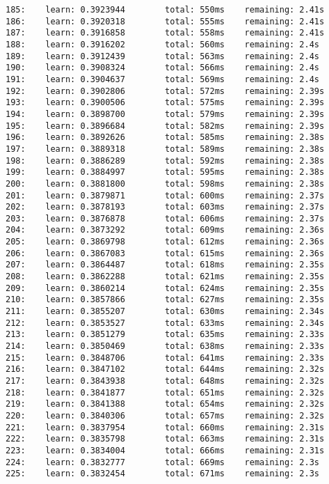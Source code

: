 \documentclass[11pt]{article}
\begin{document}
\begin{Verbatim}[commandchars=\\\{\}]
185:    learn: 0.3923944        total: 550ms    remaining: 2.41s
186:    learn: 0.3920318        total: 555ms    remaining: 2.41s
187:    learn: 0.3916858        total: 558ms    remaining: 2.41s
188:    learn: 0.3916202        total: 560ms    remaining: 2.4s
189:    learn: 0.3912439        total: 563ms    remaining: 2.4s
190:    learn: 0.3908324        total: 566ms    remaining: 2.4s
191:    learn: 0.3904637        total: 569ms    remaining: 2.4s
192:    learn: 0.3902806        total: 572ms    remaining: 2.39s
193:    learn: 0.3900506        total: 575ms    remaining: 2.39s
194:    learn: 0.3898700        total: 579ms    remaining: 2.39s
195:    learn: 0.3896684        total: 582ms    remaining: 2.39s
196:    learn: 0.3892626        total: 585ms    remaining: 2.38s
197:    learn: 0.3889318        total: 589ms    remaining: 2.38s
198:    learn: 0.3886289        total: 592ms    remaining: 2.38s
199:    learn: 0.3884997        total: 595ms    remaining: 2.38s
200:    learn: 0.3881800        total: 598ms    remaining: 2.38s
201:    learn: 0.3879871        total: 600ms    remaining: 2.37s
202:    learn: 0.3878193        total: 603ms    remaining: 2.37s
203:    learn: 0.3876878        total: 606ms    remaining: 2.37s
204:    learn: 0.3873292        total: 609ms    remaining: 2.36s
205:    learn: 0.3869798        total: 612ms    remaining: 2.36s
206:    learn: 0.3867083        total: 615ms    remaining: 2.36s
207:    learn: 0.3864487        total: 618ms    remaining: 2.35s
208:    learn: 0.3862288        total: 621ms    remaining: 2.35s
209:    learn: 0.3860214        total: 624ms    remaining: 2.35s
210:    learn: 0.3857866        total: 627ms    remaining: 2.35s
211:    learn: 0.3855207        total: 630ms    remaining: 2.34s
212:    learn: 0.3853527        total: 633ms    remaining: 2.34s
213:    learn: 0.3851279        total: 635ms    remaining: 2.33s
214:    learn: 0.3850469        total: 638ms    remaining: 2.33s
215:    learn: 0.3848706        total: 641ms    remaining: 2.33s
216:    learn: 0.3847102        total: 644ms    remaining: 2.32s
217:    learn: 0.3843938        total: 648ms    remaining: 2.32s
218:    learn: 0.3841877        total: 651ms    remaining: 2.32s
219:    learn: 0.3841388        total: 654ms    remaining: 2.32s
220:    learn: 0.3840306        total: 657ms    remaining: 2.32s
221:    learn: 0.3837954        total: 660ms    remaining: 2.31s
222:    learn: 0.3835798        total: 663ms    remaining: 2.31s
223:    learn: 0.3834004        total: 666ms    remaining: 2.31s
224:    learn: 0.3832777        total: 669ms    remaining: 2.3s
225:    learn: 0.3832454        total: 671ms    remaining: 2.3s

\end{Verbatim}
\end{document}
